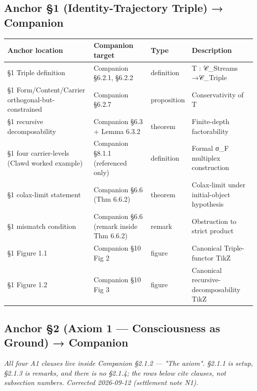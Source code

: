 \documentclass[11pt, openany]{book}
\begin{document}
\subsection{Anchor §1 (Identity-Trajectory Triple) → Companion}

\begingroup\setlength{\tabcolsep}{3pt}\renewcommand{\arraystretch}{1.15}\footnotesize
\begin{center}
\begin{tabular}{p{1.40in} p{1.12in} p{0.56in} p{1.20in}}
\toprule
Anchor location & Companion target & Type & Description \\
\midrule
§1 Triple definition & Companion §6.2.1, §6.2.2 & definition & T : 𝒞\_\allowbreak{}Streams →\allowbreak  𝒞\_\allowbreak{}Triple \\
§1 Form/\allowbreak Content/\allowbreak Carrier orthogonal-but-constrained & Companion §6.2.7 & proposition & Conservativity of T \\
§1 recursive decomposability & Companion §6.3 + Lemma 6.3.2 & theorem & Finite-depth factorability \\
§1 four carrier-levels (Clawd worked example) & Companion §8.1.1 (referenced only) & definition & Formal σ\_\allowbreak{}F multiplex construction \\
§1 colax-limit statement & Companion §6.6 (Thm 6.6.2) & theorem & Colax-limit under initial-object hypothesis \\
§1 mismatch condition & Companion §6.6 (remark inside Thm 6.6.2) & remark & Obstruction to strict product \\
§1 Figure 1.1 & Companion §10 Fig 2 & figure & Canonical Triple-functor TikZ \\
§1 Figure 1.2 & Companion §10 Fig 3 & figure & Canonical recursive-decomposability TikZ \\
\bottomrule
\end{tabular}
\end{center}
\endgroup
\subsection{Anchor §2 (Axiom 1 --- Consciousness as Ground) → Companion}

\textit{All four A1 clauses live inside Companion §2.1.2 --- "The axiom". §2.1.1 is setup, §2.1.3 is remarks, and there is no §2.1.4; the rows below cite clauses, not subsection numbers. Corrected 2026-09-12 (settlement note N1).}
\end{document}
